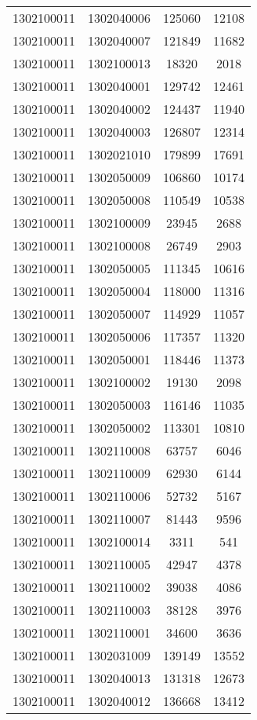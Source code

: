 \begin{longtable}[h]{llcc}
		1302100011 & 1302040006 & 125060 & 12108\\
		1302100011 & 1302040007 & 121849 & 11682\\
		1302100011 & 1302100013 & 18320 & 2018\\
		1302100011 & 1302040001 & 129742 & 12461\\
		1302100011 & 1302040002 & 124437 & 11940\\
		1302100011 & 1302040003 & 126807 & 12314\\
		1302100011 & 1302021010 & 179899 & 17691\\
		1302100011 & 1302050009 & 106860 & 10174\\
		1302100011 & 1302050008 & 110549 & 10538\\
		1302100011 & 1302100009 & 23945 & 2688\\
		1302100011 & 1302100008 & 26749 & 2903\\
		1302100011 & 1302050005 & 111345 & 10616\\
		1302100011 & 1302050004 & 118000 & 11316\\
		1302100011 & 1302050007 & 114929 & 11057\\
		1302100011 & 1302050006 & 117357 & 11320\\
		1302100011 & 1302050001 & 118446 & 11373\\
		1302100011 & 1302100002 & 19130 & 2098\\
		1302100011 & 1302050003 & 116146 & 11035\\
		1302100011 & 1302050002 & 113301 & 10810\\
		1302100011 & 1302110008 & 63757 & 6046\\
		1302100011 & 1302110009 & 62930 & 6144\\
		1302100011 & 1302110006 & 52732 & 5167\\
		1302100011 & 1302110007 & 81443 & 9596\\
		1302100011 & 1302100014 & 3311 & 541\\
		1302100011 & 1302110005 & 42947 & 4378\\
		1302100011 & 1302110002 & 39038 & 4086\\
		1302100011 & 1302110003 & 38128 & 3976\\
		1302100011 & 1302110001 & 34600 & 3636\\
		1302100011 & 1302031009 & 139149 & 13552\\
		1302100011 & 1302040013 & 131318 & 12673\\
		1302100011 & 1302040012 & 136668 & 13412\\

\end{longtable}
